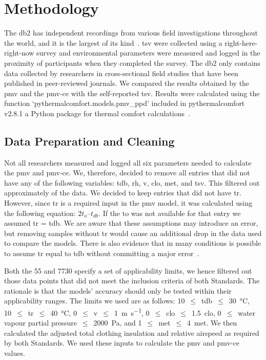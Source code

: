 \section{Methodology}\label{sec:methodology}
The \ac{db2} has  independent recordings from various field investigations throughout the world, and it is the largest of its kind~\cite{FoldvaryLicina2018, db2dryad}.
\Ac{tsv} were collected using a right-here-right-now survey and environmental parameters were measured and logged in the proximity of participants when they completed the survey.
The \ac{db2} only contains data collected by researchers in cross-sectional field studies that have been published in peer-reviewed journals.
 We compared the results obtained by the \ac{pmv} and the \ac{pmv-ce} with the self-reported \ac{tsv}.
Results were calculated using the function `pythermalcomfort.models.pmv\_ppd' included in pythermalcomfort v2.8.1 a Python package for thermal comfort calculations~\cite{Tartarini2020a}.

\subsection{Data Preparation and Cleaning}\label{subsec:data-processing-and-cleaning}
Not all researchers measured and logged all six parameters needed to calculate the \ac{pmv} and \ac{pmv-ce}.
We, therefore, decided to remove all entries that did not have any of the following variables: \ac{tdb}, \ac{rh}, \ac{v}, \ac{clo}, \ac{met}, and \ac{tsv}.
This filtered out approximately  of the data.
We decided to keep entries that did not have \ac{tr}.
However, since \ac{tr} is a required input in the \ac{pmv} model, it was calculated using the following equation: $2 t_{o} – t_{db}$.
If the \ac{to} was not available for that entry we assumed \ac{tr} = \ac{tdb}.
We are aware that these assumptions may introduce an error, but removing samples without \ac{tr} would cause an additional  drop in the data used to compare the models.
There is also evidence that in many conditions is possible to assume \ac{tr} equal to \ac{tdb} without committing a major error~\cite{Dawe2020}.

Both the \gls{55} and \gls{7730} specify a set of applicability limits, we hence filtered out those data points that did not meet the inclusion criteria of both Standards.
The rationale is that the models' accuracy should only be tested within their applicability ranges.
The limits we used are as follows:
\num{10}~$\leq$~\ac{tdb}~$\leq$~\qty{30}{\celsius},
\num{10}~$\leq$~\ac{tr}~$\leq$~\qty{40}{\celsius},
\num{0}~$\leq$~\ac{v}~$\leq$~\qty{1}{\m\per\s},
\num{0}~$\leq$~\ac{clo}~$\leq$~\qty{1.5}{clo},
\num{0}~$\leq$~water vapour partial pressure~$\leq$~\qty{2000}{\pascal},
and \num{1}~$\leq$~\ac{met}~$\leq$~\qty{4}{met}.
We then calculated the adjusted total clothing insulation and relative airspeed as required by both Standards.
We used these inputs to calculate the \ac{pmv} and \ac{pmv-ce} values.

